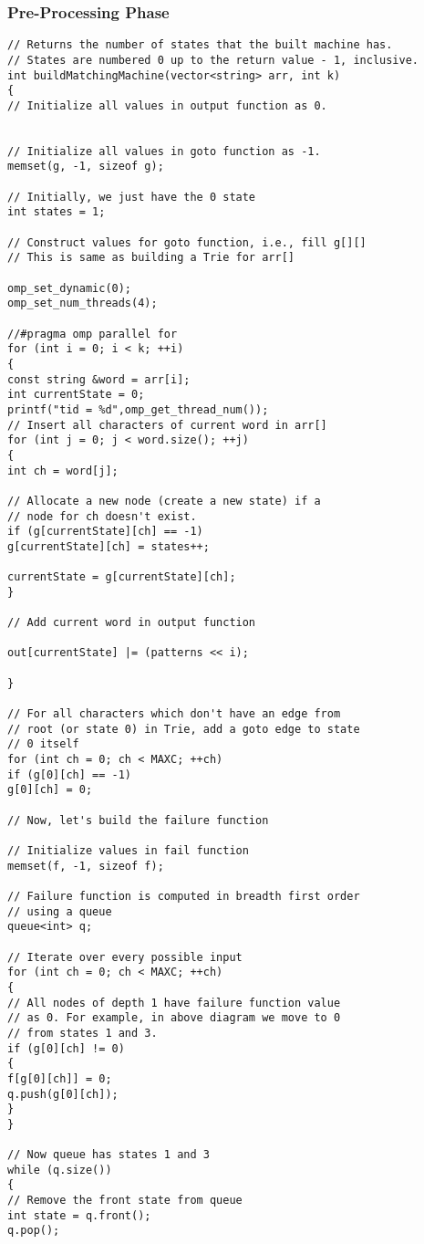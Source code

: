 \subsubsection{Pre-Processing Phase}
\begin{lstlisting}
// Returns the number of states that the built machine has.
// States are numbered 0 up to the return value - 1, inclusive.
int buildMatchingMachine(vector<string> arr, int k)
{
// Initialize all values in output function as 0.


// Initialize all values in goto function as -1.
memset(g, -1, sizeof g);

// Initially, we just have the 0 state
int states = 1;

// Construct values for goto function, i.e., fill g[][]
// This is same as building a Trie for arr[]

omp_set_dynamic(0);
omp_set_num_threads(4);

//#pragma omp parallel for
for (int i = 0; i < k; ++i)
{
const string &word = arr[i];
int currentState = 0;
printf("tid = %d",omp_get_thread_num());
// Insert all characters of current word in arr[]
for (int j = 0; j < word.size(); ++j)
{
int ch = word[j];

// Allocate a new node (create a new state) if a
// node for ch doesn't exist.
if (g[currentState][ch] == -1)
g[currentState][ch] = states++;

currentState = g[currentState][ch];
}

// Add current word in output function

out[currentState] |= (patterns << i);

}

// For all characters which don't have an edge from
// root (or state 0) in Trie, add a goto edge to state
// 0 itself
for (int ch = 0; ch < MAXC; ++ch)
if (g[0][ch] == -1)
g[0][ch] = 0;

// Now, let's build the failure function

// Initialize values in fail function
memset(f, -1, sizeof f);

// Failure function is computed in breadth first order
// using a queue
queue<int> q;

// Iterate over every possible input
for (int ch = 0; ch < MAXC; ++ch)
{
// All nodes of depth 1 have failure function value
// as 0. For example, in above diagram we move to 0
// from states 1 and 3.
if (g[0][ch] != 0)
{
f[g[0][ch]] = 0;
q.push(g[0][ch]);
}
}

// Now queue has states 1 and 3
while (q.size())
{
// Remove the front state from queue
int state = q.front();
q.pop();


\end{lstlisting}
